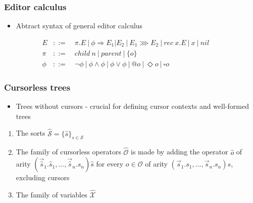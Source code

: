 \documentclass[t,24pt,aspectratio=169]{beamer}
\begin{document}
\begin{frame}
    \frametitle{Editor calculus}
    \begin{itemize}
        \item Abtract syntax of general editor calculus
    \end{itemize}
    \vspace{1cm}
    \[
        \begin{aligned}
            E    & ::= \quad \pi.E \ | \ \phi \Rightarrow E_1|E_2 \ | \ E_1 \ggg E_2 \ | \ rec \ x.E \ | \ x \ | \ nil      &  & \\
            \pi  & ::= \quad child \ n \ | \ parent \ | \ \{ o \}                                                           &  & \\
            \phi & ::= \quad \neg \phi \ | \ \phi \land \phi \ | \ \phi \lor \phi \ | \ @o \ | \ \Diamond o \ | \ \square o
        \end{aligned}
    \]
\end{frame}

\begin{frame}
    \frametitle{Cursorless trees}
    \begin{itemize}
        \item Trees without cursors - crucial for defining cursor contexts and well-formed trees
    \end{itemize}
    \vspace{1cm}
    \begin{enumerate}
        \item The sorts $\hat{\mathcal{S}} = \{ \hat{s} \}_{s \in \mathcal{S}}$
        \item The family of cursorless operators $\hat{\mathcal{O}}$ is made by adding
              the operator $\hat{o}$ of arity
              $(\vec{\hat{s}}_1.\hat{s}_1,...,\vec{\hat{s}}_n.\hat{s}_n)\hat{s}$
              for every $o \in \mathcal{O}$ of arity $(\vec{s}_1.s_1,...,\vec{s}_n.s_n)s$, excluding cursors
        \item The family of variables $\hat{\mathcal{X}}$
    \end{enumerate}
\end{frame}
\end{document}
